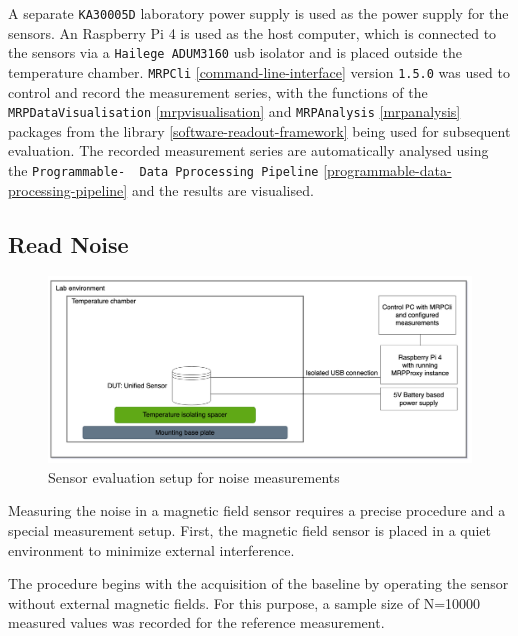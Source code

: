 A separate \passthrough{\lstinline!KA30005D!} laboratory power supply is
used as the power supply for the sensors. An Raspberry Pi 4 is used as
the host computer, which is connected to the sensors via a
\passthrough{\lstinline!Hailege ADUM3160!} \gls{usb} isolator and is
placed outside the temperature chamber. \passthrough{\lstinline!MRPCli!}
\ref{command-line-interface} version \passthrough{\lstinline!1.5.0!} was
used to control and record the measurement series, with the functions of
the \passthrough{\lstinline!MRPDataVisualisation!}
\ref{mrpvisualisation} and \passthrough{\lstinline!MRPAnalysis!}
\ref{mrpanalysis} packages from the library
\ref{software-readout-framework} being used for subsequent evaluation.
The recorded measurement series are automatically analysed using the
\passthrough{\lstinline!Programmable-  Data Pprocessing Pipeline!}
\ref{programmable-data-processing-pipeline} and the results are
visualised.

\hypertarget{read-noise}{%
\subsection{Read Noise}\label{read-noise}}

\begin{figure}
\centering
\includegraphics{./generated_images/border_Sensor_evaluation_setup_for_noise_measurements.png}
\caption{Sensor evaluation setup for noise measurements
\label{Sensor_evaluation_setup_for_noise_measurements.png}}
\end{figure}

Measuring the noise in a magnetic field sensor requires a precise
procedure and a special measurement setup. First, the magnetic field
sensor is placed in a quiet environment to minimize external
interference.

The procedure begins with the acquisition of the baseline by operating
the sensor without external magnetic fields. For this purpose, a sample
size of N=10000 measured values was recorded for the reference
measurement.

